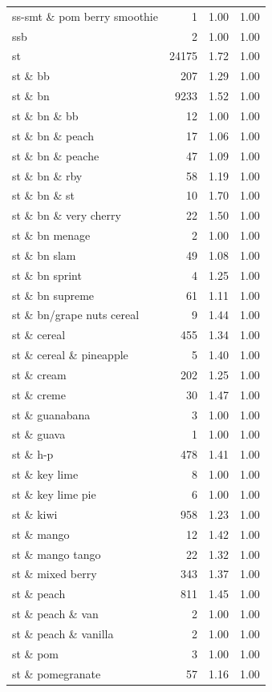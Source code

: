 \begin{table}
\begin{tabular}{lrrr}
ss-smt \& pom berry smoothie & 1 & 1.00 & 1.00 \\
ssb & 2 & 1.00 & 1.00 \\
st & 24175 & 1.72 & 1.00 \\
st \& bb & 207 & 1.29 & 1.00 \\
st \& bn & 9233 & 1.52 & 1.00 \\
st \& bn \& bb & 12 & 1.00 & 1.00 \\
st \& bn \& peach & 17 & 1.06 & 1.00 \\
st \& bn \& peache & 47 & 1.09 & 1.00 \\
st \& bn \& rby & 58 & 1.19 & 1.00 \\
st \& bn \& st & 10 & 1.70 & 1.00 \\
st \& bn \& very cherry & 22 & 1.50 & 1.00 \\
st \& bn menage & 2 & 1.00 & 1.00 \\
st \& bn slam & 49 & 1.08 & 1.00 \\
st \& bn sprint & 4 & 1.25 & 1.00 \\
st \& bn supreme & 61 & 1.11 & 1.00 \\
st \& bn/grape nuts cereal & 9 & 1.44 & 1.00 \\
st \& cereal & 455 & 1.34 & 1.00 \\
st \& cereal \& pineapple & 5 & 1.40 & 1.00 \\
st \& cream & 202 & 1.25 & 1.00 \\
st \& creme & 30 & 1.47 & 1.00 \\
st \& guanabana & 3 & 1.00 & 1.00 \\
st \& guava & 1 & 1.00 & 1.00 \\
st \& h-p & 478 & 1.41 & 1.00 \\
st \& key lime & 8 & 1.00 & 1.00 \\
st \& key lime pie & 6 & 1.00 & 1.00 \\
st \& kiwi & 958 & 1.23 & 1.00 \\
st \& mango & 12 & 1.42 & 1.00 \\
st \& mango tango & 22 & 1.32 & 1.00 \\
st \& mixed berry & 343 & 1.37 & 1.00 \\
st \& peach & 811 & 1.45 & 1.00 \\
st \& peach \& van & 2 & 1.00 & 1.00 \\
st \& peach \& vanilla & 2 & 1.00 & 1.00 \\
st \& pom & 3 & 1.00 & 1.00 \\
st \& pomegranate & 57 & 1.16 & 1.00 \\

\end{tabular}
\end{table}
